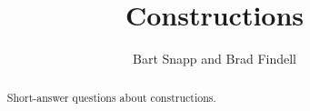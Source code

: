 \documentclass[nooutcomes]{ximera}
\title{Constructions}
\author{Bart Snapp and Brad Findell}
\begin{document}
\begin{abstract}
Short-answer questions about constructions.
\end{abstract}
\maketitle

%
\end{document}
